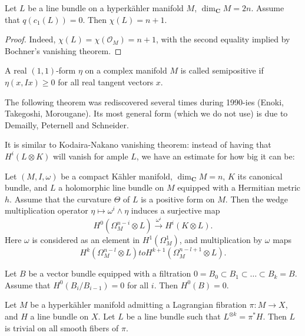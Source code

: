 \begin{corollary}
\label{corollary-huybrechts-chi}
Let \(L\) be a line bundle on a hyperk\"ahler
manifold \(M\), \(\dim_{\mathbf{C}} M = 2n\).
Assume that \(q(c_1(L))=0\). Then
\(\chi(L)=n+1\).
\end{corollary}

\begin{proof}
Indeed, \(\chi(L)=\chi(\mathcal{O}_M)=n+1\),
with the second equality implied by
Bochner's vanishing theorem.
\end{proof}

\begin{definition}
\label{definition-semipositive}
A real \((1,1)\)-form \(\eta\) on a complex
manifold \(M\) is called semipositive if
\(\eta(x,Ix)\geq 0\) for all real tangent
vectors \(x\).
\end{definition}

\medskip\noindent
The following theorem was rediscovered
several times during 1990-ies (Enoki,
Takegoshi, Morougane). Its most general form
(which we do not use) is due to Demailly,
Peternell and Schneider.

It is similar to Kodaira-Nakano
vanishing theorem: instead of having that
$H^i(L \otimes K)$ will vanish for ample $L$,
we have an estimate for how big it can be:

\begin{theorem}[ETMDPS]
\label{theorem-etmdps-vanishing}
Let \((M,I,\omega)\) be a compact K\"ahler
manifold, \(\dim_{\mathbf{C}} M = n\), \(K\)
its canonical bundle, and \(L\) a
holomorphic line bundle on \(M\) equipped
with a Hermitian metric \(h\). Assume that
the curvature \(\Theta\) of \(L\) is a
positive form on \(M\). Then the wedge
multiplication operator \(\eta \mapsto
\omega^i \wedge \eta\) induces a surjective
map
\[
H^0(\Omega^{n-i}_M \otimes L)
\xrightarrow{\ \omega^i\ }
H^i(K \otimes L).
\]
Here \(\omega\) is considered as an element
in \(H^1(\Omega^1_M)\), and multiplication by
\(\omega\) maps
\[
H^k(\Omega^{n-l}_M \otimes L)
to H^{k+1}(\Omega^{n-l+1}_M \otimes L).
\]
\end{theorem}

\begin{lemma}
\label{lemma-global-sections-vanish}
Let \(B\) be a vector bundle equipped with a
filtration \(0 = B_0 \subset B_1 \subset
\ldots \subset B_k = B\). Assume that
\(H^0(B_i/B_{i-1}) = 0\) for all \(i\).
Then \(H^0(B)=0\).
\end{lemma}

\begin{theorem}
\label{theorem-line-bundle-trivial-on-fibers}
Let \(M\) be a hyperk\"ahler manifold
admitting a Lagrangian fibration
\(\pi : M \to X\), and \(H\) a line bundle on
\(X\). Let \(L\) be a line bundle such that
\(L^{\otimes k} = \pi^*H\). Then \(L\) is
trivial on all smooth fibers of \(\pi\).
\end{theorem}

